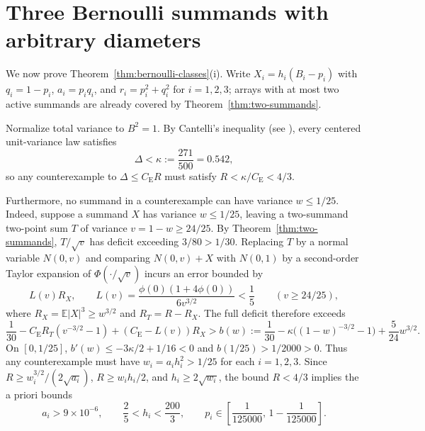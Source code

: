 \documentclass[11pt]{article}
\numberwithin{equation}{section}
\theoremstyle{definition}
\theoremstyle{remark}
\newcommand{\E}{\mathbb E}
\newcommand{\be}{C_{\mathrm E}}
\begin{document}
\section{Three Bernoulli summands with arbitrary diameters}\label{sec:three}

We now prove Theorem~\ref{thm:bernoulli-classes}(i). Write
$X_i=h_i(B_i-p_i)$ with $q_i=1-p_i$, $a_i=p_iq_i$, and $r_i=p_i^2+q_i^2$ for
$i=1,2,3$; arrays with at most two active summands are already covered by
Theorem~\ref{thm:two-summands}.

Normalize total variance to $B^2=1$. By Cantelli's inequality (see
\citet{BellIndependent2026}), every
centered unit-variance law satisfies
\begin{equation}\label{eq:kappa}
 \Delta<\kappa:=\frac{271}{500}=0.542,
\end{equation}
so any counterexample to $\Delta\le\be R$ must satisfy $R<\kappa/\be<4/3$.

Furthermore, no summand in a counterexample can have variance $w\le1/25$.
Indeed, suppose a summand $X$ has variance $w\le1/25$, leaving a two-summand
two-point sum $T$ of variance $v=1-w\ge24/25$. By Theorem~\ref{thm:two-summands},
$T/\sqrt v$ has deficit exceeding $3/80>1/30$. Replacing $T$ by a normal
variable $N(0,v)$ and comparing $N(0,v)+X$ with $N(0,1)$ by a second-order
Taylor expansion of $\Phi(\cdot/\sqrt v)$ incurs an error bounded by
\[
 L(v)R_X,\qquad
 L(v)=\frac{\phi(0)(1+4\phi(0))}{6v^{3/2}}<\frac15
 \qquad(v\ge24/25),
\]
where $R_X=\E|X|^3\ge w^{3/2}$ and $R_T=R-R_X$. The full deficit therefore
exceeds
\[
 \frac1{30}-\be R_T(v^{-3/2}-1)+(\be-L(v))R_X
 > b(w):=\frac1{30}-\kappa\bigl((1-w)^{-3/2}-1\bigr)+\frac5{24}w^{3/2}.
\]
On $[0,1/25]$, $b'(w)\le-3\kappa/2+1/16<0$ and $b(1/25)>1/2000>0$. Thus any
counterexample must have $w_i=a_ih_i^2>1/25$ for each $i=1,2,3$. Since
$R\ge w_i^{3/2}/(2\sqrt{a_i})$, $R\ge w_ih_i/2$, and $h_i\ge2\sqrt{w_i}$,
the bound $R<4/3$ implies the a priori bounds
\begin{equation}\label{eq:n3-collars}
 a_i>9\times10^{-6},\qquad \frac25<h_i<\frac{200}{3},
 \qquad p_i\in\left[\frac1{125000},\,1-\frac1{125000}\right].
\end{equation}
\end{document}
